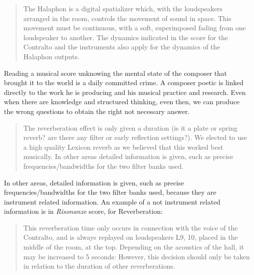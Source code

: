 \documentclass[twoside,a4paper]{article}
\begin{document}
\begin{quote}
The Halaphon is a digital spatializer which, with the loudspeakers arranged in the room, controls the movement of sound in space. This movement must be continuous, with a soft, superimposed fading from one loudspeaker to another. The dynamics indicated in the score for the Contralto and the instruments also apply for the dynamics of the Halaphon outputs\cite{nlre87}. %
\end{quote}

Reading a musical score unknowing the mental state of the composer that brought it to the world is a daily committed crime. A composer poetic is linked directly to the work he is producing and his musical practice and research. Even when there are knowledge and structured thinking, even then, we can produce the wrong questions to obtain the right not necessary answer.  

\begin{quote}
The reverberation effect is only given a duration (is it a plate or spring reverb? are there any filter or early reflection settings?). We elected to use a high quality Lexicon reverb as we believed that this worked best musically. In other areas detailed information is given, such as precise frequencies/bandwidths for the two filter banks used\cite{rw05}.
\end{quote}

In other areas, detailed information is given, such as precise frequencies/bandwidths for the two filter banks used, because they are instrument related information. An example of a not instrument related information is in \emph{Risonanze} score, for Reverberation: 

\begin{quote}
This reverberation time only occurs in connection with the voice of the Contralto, and is always replayed on loudspeakers L9, 10, placed in the middle of the room, at the top. Depending on the acoustics of the hall, it may be increased to 5 seconds: However, this decision should only be taken in relation to the duration of other reverberations\cite{nlre87}.
\end{quote}
\end{document}
